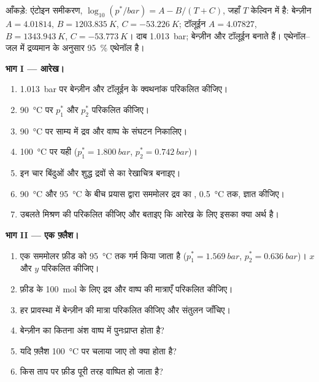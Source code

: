 \begin{problem}
\label{pb:b2:liquid-vapour-diagrams:1}
आँकड़े: एंटोइन समीकरण, $\log_{10}(p^*/\unit{bar}) = A - B/(T + C)$, जहाँ $T$
केल्विन में है: बेन्ज़ीन $A = 4.01814$, $B = \qty{1203.835}{K}$, $C =
\qty{-53.226}{K}$; टॉलूईन $A = 4.07827$, $B = \qty{1343.943}{K}$, $C =
\qty{-53.773}{K}$। दाब \qty{1.013}{bar}; बेन्ज़ीन और टॉलूईन  बनाते हैं। एथेनॉल--जल  में द्रव्यमान के अनुसार 95~\% एथेनॉल है।

\medskip
\noindent\textbf{भाग I --- आरेख।}
\begin{enumerate}
  \item \qty{1.013}{bar} पर बेन्ज़ीन और टॉलूईन के क्वथनांक परिकलित कीजिए।
  \item \qty{90}{\degreeCelsius} पर $p_1^*$ और $p_2^*$ परिकलित कीजिए।
  \item \qty{90}{\degreeCelsius} पर साम्य में द्रव और वाष्प के
        संघटन निकालिए।
  \item \qty{100}{\degreeCelsius} पर यही ($p_1^* = \qty{1.800}{bar}$, $p_2^* =
        \qty{0.742}{bar}$)।
  \item इन चार बिंदुओं और शुद्ध द्रवों से  का रेखाचित्र बनाइए।
  \item \qty{90}{\degreeCelsius} और
        \qty{95}{\degreeCelsius} के बीच प्रयास द्वारा सममोलर द्रव का ,
        \qty{0.5}{\degreeCelsius} तक, ज्ञात कीजिए।
  \item उबलते मिश्रण की  परिकलित कीजिए और बताइए कि
        आरेख के लिए इसका क्या अर्थ है।
\end{enumerate}

\medskip
\noindent\textbf{भाग II --- एक फ़्लैश।}
\begin{enumerate}[resume]
  \item एक सममोलर फ़ीड को \qty{95}{\degreeCelsius} तक गर्म किया जाता है ($p_1^* =
        \qty{1.569}{bar}$, $p_2^* = \qty{0.636}{bar}$)। $x$ और $y$ परिकलित कीजिए।
  \item फ़ीड के \qty{100}{mol} के लिए द्रव और वाष्प की मात्राएँ परिकलित कीजिए।
  \item हर प्रावस्था में बेन्ज़ीन की मात्रा परिकलित कीजिए और संतुलन जाँचिए।
  \item बेन्ज़ीन का कितना अंश वाष्प में पुनःप्राप्त होता है?
  \item यदि फ़्लैश \qty{100}{\degreeCelsius} पर चलाया जाए तो क्या होता है?
  \item किस ताप पर फ़ीड पूरी तरह वाष्पित हो जाता है?
\end{enumerate}


\end{problem}
